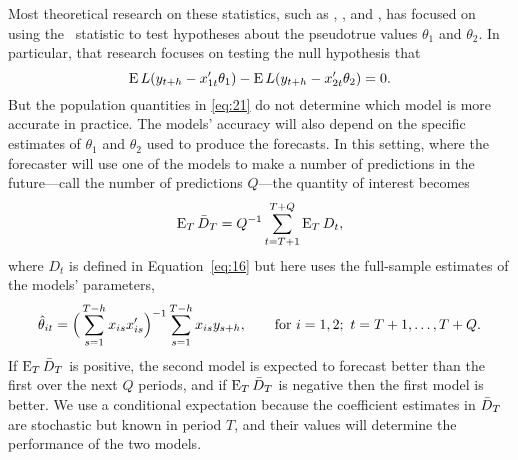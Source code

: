 \documentclass[12pt]{article}
\begin{document}
Most theoretical research on these statistics, such as \citet{DiM:95}, \citet{Wes:96},
and \cite{Mcc:07}, has focused on using the \oost\ statistic to test
hypotheses about the pseudotrue values $\theta_1$ and $\theta_2$.  In
particular, that research focuses on testing the null hypothesis that
\begin{equation}\label{eq:21}
  \operatorname{E} L(y_{t+h} - x_{1t}'\theta_{1}) - \operatorname{E} L(y_{t+h} - x_{2t}'\theta_{2}) = 0.
\end{equation}
But the population quantities in \eqref{eq:21} do not determine which
model is more accurate in practice. The models'
accuracy will also depend on the specific estimates of $\theta_1$ and
$\theta_2$ used to produce the forecasts. In this setting, where the
forecaster will use one of the models to make a number of predictions
in the future---call the number of predictions $Q$---the quantity of
interest becomes
\begin{equation}
  \operatorname{E}_T \bar{D}_{T} = Q^{-1} \sum_{t=T+1}^{T+Q} \operatorname{E}_T D_t,
\end{equation}
where $D_t$ is defined in Equation~\eqref{eq:16} but here uses the
full-sample estimates of the models' parameters,
\begin{equation}
  \hat\theta_{it} = \Big(\sum_{s=1}^{T-h} x_{is}x_{is}'\Big)^{-1} \sum_{s=1}^{T-h}
  x_{is} y_{s+h}, \qquad \text{for } i=1,2;\ t = T+1,\dots, T + Q.
\end{equation}
If $\operatorname{E}_T \bar{D}_{T}$ is positive, the second model is expected to forecast
better than the first over the next $Q$ periods, and if $\operatorname{E}_T \bar{D}_{T}$
is negative then the first model is better. We use a conditional
expectation because the coefficient estimates in $\bar{D}_{T}$ are
stochastic but known in period $T$, and their values will determine
the performance of the two models.
\end{document}
